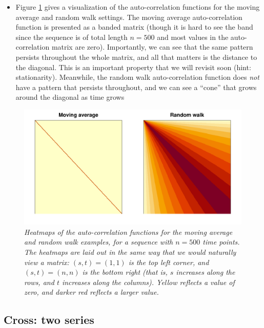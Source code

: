\documentclass{article}
\begin{document}
\begin{itemize}
\item Figure \ref{fig:heatmap} gives a visualization of the auto-correlation
  functions for the moving average and random walk settings. The moving average
  auto-correlation function is presented as a banded matrix (though it is hard
  to see the band since the sequence is of total length $n=500$ and most values
  in the auto-correlation matrix are zero). Importantly, we can see that the
  same pattern persists throughout the whole matrix, and all that matters is the 
  distance to the diagonal. This is an important property that we will revisit
  soon (hint: stationarity). Meanwhile, the random walk auto-correlation
  function does \emph{not} have a pattern that persists throughout, and we can
  see a ``cone'' that grows around the diagonal as time grows
\end{itemize}

\begin{figure}[htb]
\centering
\includegraphics[width=\textwidth]{fig/heatmap-1.pdf}
\caption{\it Heatmaps of the auto-correlation functions for the moving average 
  and random walk examples, for a sequence with $n=500$ time points. The  
  heatmaps are laid out in the same way that we would naturally view a matrix:
  $(s,t) = (1,1)$ is the top left corner, and $(s,t) = (n,n)$ is the bottom
  right (that is, $s$ increases along the rows, and $t$ increases along the
  columns). Yellow reflects a value of zero, and darker red reflects a larger
  value.} 
\label{fig:heatmap}
\end{figure}

\subsection{Cross: two series}
\end{document}
